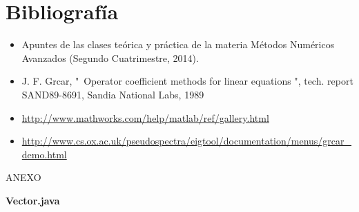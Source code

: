 \documentclass[a4paper,10pt]{article}
\begin{document}
\section{Bibliografía}
\begin{itemize}

\item Apuntes de las clases teórica y práctica de la materia Métodos Numéricos Avanzados (Segundo Cuatrimestre, 2014).

\item J. F. Grcar, "\ Operator coefficient methods for linear equations ", tech. report SAND89-8691, Sandia National Labs, 1989 

\item \url{http://www.mathworks.com/help/matlab/ref/gallery.html}

\item \url{http://www.cs.ox.ac.uk/pseudospectra/eigtool/documentation/menus/grcar_demo.html}

\end{itemize} 

\pagebreak

\begin{large}
ANEXO
\end{large}

\begin{center}
\textbf{Vector.java}
\end{center}
\end{document}
